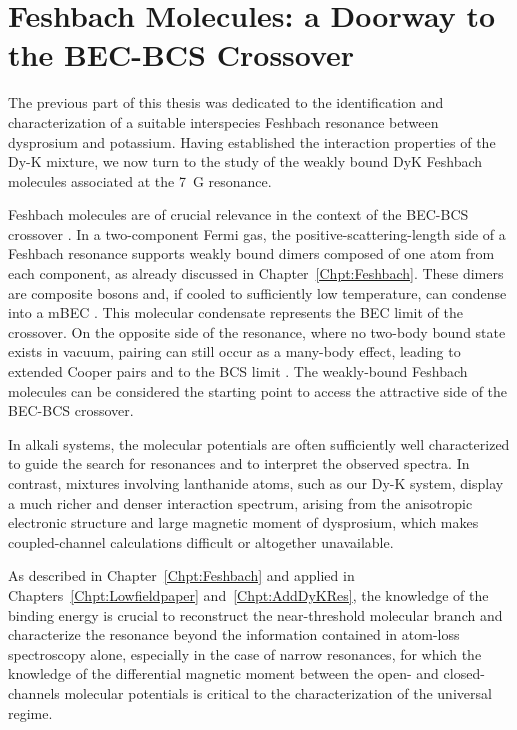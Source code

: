 \chapter{Feshbach Molecules: a Doorway to the BEC-BCS Crossover}
\label{Chpt:FeshmolIntro}

The previous part of this thesis was dedicated to the identification and characterization of a suitable interspecies Feshbach resonance between dysprosium and potassium. Having established the interaction properties of the Dy-K mixture, we now turn to the study of the weakly bound DyK Feshbach molecules associated at the \SI{7}{G} resonance.

Feshbach molecules are of crucial relevance in the context of the \ac{BEC}-\ac{BCS} crossover \cite{Eagles1969ppw, Leggett1980xxx, Nozieres1985bci, Giorgini2008tou, Strinati2018tbb}. In a two-component Fermi gas, the positive-scattering-length side of a Feshbach resonance supports weakly bound dimers composed of one atom from each component, as already discussed in Chapter~\ref{Chpt:Feshbach}. These dimers are composite bosons and, if cooled to sufficiently low temperature, can condense into a \ac{mBEC} \cite{Jochim2003bec, Greiner2003eoa, Zwierlein2003oob}. This molecular condensate represents the \ac{BEC} limit of the crossover. On the opposite side of the resonance, where no two-body bound state exists in vacuum, pairing can still occur as a many-body effect, leading to extended Cooper pairs and to the \ac{BCS} limit \cite{Regal2004oor, Bartenstein2004cfa, Zwierlein2004cop, Chin2004oop}. The weakly-bound Feshbach molecules can be considered the starting point to access the attractive side of the \ac{BEC}-\ac{BCS} crossover.


In alkali systems, the molecular potentials are often sufficiently well characterized to guide the search for resonances and to interpret the observed spectra. In contrast, mixtures involving lanthanide atoms, such as our Dy-K system, display a much richer and denser interaction spectrum, arising from the anisotropic electronic structure and large magnetic moment of dysprosium, which makes coupled-channel calculations difficult or altogether unavailable. 

As described in Chapter~\ref{Chpt:Feshbach} and applied in Chapters~\ref{Chpt:Lowfieldpaper} and~\ref{Chpt:AddDyKRes}, the knowledge of the binding energy is crucial to reconstruct the near-threshold molecular branch and characterize the resonance beyond the information contained in atom-loss spectroscopy alone, especially in the case of narrow resonances, for which the knowledge of the differential magnetic moment between the open- and closed-channels molecular potentials is critical to the characterization of the universal regime. 

